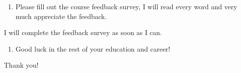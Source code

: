 \documentclass[12pt]{article}
\begin{document}
\begin{enumerate}[resume]
    \item Please fill out the course feedback survey, I will read every word and very much appreciate the feedback.
\end{enumerate}
    \par I will complete the feedback survey as soon as I can.

\begin{enumerate}
    \item Good luck in the rest of your education and career!
\end{enumerate}
    \par Thank you!
\end{document}
